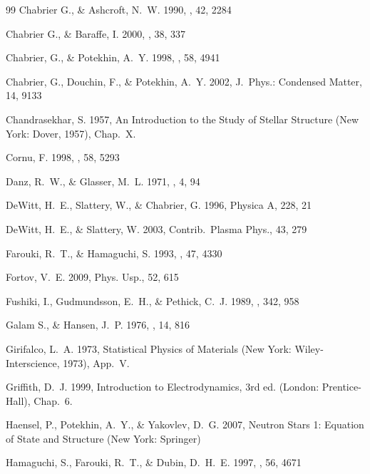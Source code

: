 \documentclass[traditabstract]{aa}
\begin{document}
\begin{thebibliography}{99}
Chabrier G., \& Ashcroft, N.~W.
1990,
\pra, 42, 2284

Chabrier G., \& Baraffe, I.
2000,
\araa, 38, 337

Chabrier, G., \& Potekhin, A.~Y.
1998,
\pre, 58, 4941

Chabrier, G., Douchin, F., \& Potekhin, A.~Y.
2002,
J.~Phys.: Condensed Matter, 14, 9133

Chandrasekhar, S.
1957,
{An Introduction to the Study of Stellar
Structure} 
(New York: Dover, 1957), Chap.~X.

Cornu, F.
1998,
\pre, 58, 5293

Danz, R.~W., \& Glasser, M.~L.
1971,
\prb, 4, 94

DeWitt, H.~E., Slattery, W., \& Chabrier, G.
1996,
Physica A, 228, 21

DeWitt, H.~E., \& Slattery, W.
2003,
Contrib.\ Plasma Phys., {43}, 279

Farouki, R.~T., \& Hamaguchi, S.
1993,
\pre, 47, 4330

Fortov, V.~E.
2009,
Phys. Usp., 52, 615

Fushiki, I., Gudmundsson,  E.~H., \& Pethick, C.~J.
1989,
\apj, 342, 958

Galam S., \& Hansen, J.~P.
1976,
\pra, 14, 816

Girifalco, L.~A.
1973,
{Statistical Physics of Materials} 
(New York: Wiley-Interscience, 1973), App.~V.

Griffith, D.~J.
1999,
{Introduction to Electrodynamics}, 3rd ed.
(London: Prentice-Hall), Chap.~6.

 Haensel, P., Potekhin, A.~Y., \& Yakovlev, D.~G.
 2007,
Neutron Stars 1: Equation of State and Structure
(New York: Springer)

Hamaguchi, S., Farouki,  R.~T., \& Dubin,  D.~H.~E.
1997,
\pre, 56, 4671


\end{thebibliography}
\end{document}
